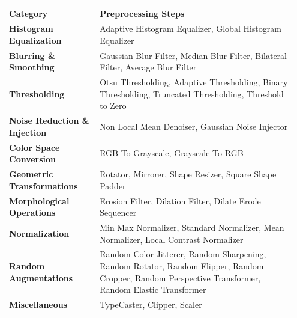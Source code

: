 \documentclass[journal]{new-aiaa}
\begin{document}
\begin{longtable}{|p{0.3\linewidth}|p{0.65\linewidth}|}
	\hline
	\textbf{Category}                     & \textbf{Preprocessing Steps}                                                                                                                         \\
	\hline
	\endhead
	\hline
	\endfoot

	\textbf{Histogram Equalization}       & Adaptive Histogram Equalizer, Global Histogram Equalizer                                                                                             \\
	\hline
	\textbf{Blurring \& Smoothing}        & Gaussian Blur Filter, Median Blur Filter, Bilateral Filter, Average Blur Filter                                                                      \\
	\hline
	\textbf{Thresholding}                 & Otsu Thresholding, Adaptive Thresholding, Binary Thresholding, Truncated Thresholding, Threshold to Zero                                             \\
	\hline
	\textbf{Noise Reduction \& Injection} & Non Local Mean Denoiser, Gaussian Noise Injector                                                                                                     \\
	\hline
	\textbf{Color Space Conversion}       & RGB To Grayscale, Grayscale To RGB                                                                                                                   \\
	\hline
	\textbf{Geometric Transformations}    & Rotator, Mirrorer, Shape Resizer, Square Shape Padder                                                                                                \\
	\hline
	\textbf{Morphological Operations}     & Erosion Filter, Dilation Filter, Dilate Erode Sequencer                                                                                              \\
	\hline
	\textbf{Normalization}                & Min Max Normalizer, Standard Normalizer, Mean Normalizer, Local Contrast Normalizer                                                                  \\
	\hline
	\textbf{Random Augmentations}         & Random Color Jitterer, Random Sharpening, Random Rotator, Random Flipper, Random Cropper, Random Perspective Transformer, Random Elastic Transformer \\
	\hline
	\textbf{Miscellaneous}                & TypeCaster, Clipper, Scaler                                                                                                                          \\
	\hline
\end{longtable}
\end{document}
